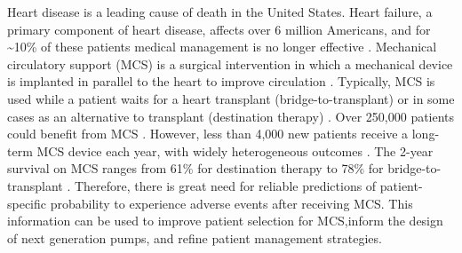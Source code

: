 \documentclass{article}
\begin{document}
Heart disease is a leading cause of death in the United States. Heart
failure, a primary component of heart disease, affects over 6 million
Americans, and for \textasciitilde10\% of these patients medical
management is no longer effective
\cite{benjamin2017heart,national2017health}. Mechanical circulatory
support (MCS) is a surgical intervention in which a mechanical device is
implanted in parallel to the heart to improve circulation
\cite{patel2014contemporary}. Typically, MCS is used while a patient
waits for a heart transplant (bridge-to-transplant) or in some cases as
an alternative to transplant (destination therapy)
\cite{slaughter2009advanced}. Over 250,000 patients could benefit from
MCS \cite{miller2011left}. However, less than 4,000 new patients receive
a long-term MCS device each year, with widely heterogeneous outcomes
\cite{stewart2011keeping}. The 2-year survival on MCS ranges from 61\%
for destination therapy to 78\% for bridge-to-transplant
\cite{patel2014contemporary}. Therefore, there is great need for
reliable predictions of patient-specific probability to experience
adverse events after receiving MCS. This information can be used to
improve patient selection for MCS,inform the design of next generation
pumps, and refine patient management strategies.



\end{document}
